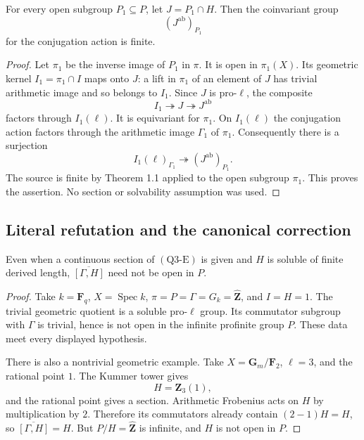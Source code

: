 \begin{lemma}
\label{q3:relative}
For every open subgroup \(P_1\subseteq P\), let \(J=P_1\cap H\).
Then the coinvariant group
\[
(J^{\mathrm{ab}})_{P_1}
\]
for the conjugation action is finite.
\end{lemma}

\begin{proof}
Let \(\pi_1\) be the inverse image of \(P_1\) in \(\pi\).  It is open
in \(\pi_1(X)\).  Its geometric kernel
\(I_1=\pi_1\cap I\) maps onto \(J\): a lift in \(\pi_1\) of an
element of \(J\) has trivial arithmetic image and so belongs to
\(I_1\).  Since \(J\) is pro-\(\ell\), the composite
\[
I_1\twoheadrightarrow J\twoheadrightarrow J^{\mathrm{ab}}
\]
factors through \(I_1(\ell)\).  It is equivariant for \(\pi_1\).
On \(I_1(\ell)\) the conjugation action factors through the arithmetic
image \(\Gamma_1\) of \(\pi_1\).  Consequently there is a surjection
\[
I_1(\ell)_{\Gamma_1}\twoheadrightarrow
(J^{\mathrm{ab}})_{P_1}.
\]
The source is finite by Theorem 1.1 applied to the open subgroup
\(\pi_1\).  This proves the assertion.  No section or solvability
assumption was used.
\end{proof}

\subsection{Literal refutation and the canonical correction}

\begin{proposition}
\label{q3:literal}
Even when a continuous section of \((\mathrm{Q3\text{-}E})\) is given
and \(H\) is soluble of finite derived length,
\(\overline{[\Gamma,H]}\) need not be open in \(P\).
\end{proposition}

\begin{proof}
Take \(k=\mathbf F_q\), \(X=\operatorname{Spec}k\),
\(\pi=P=\Gamma=G_k=\widehat{\mathbf Z}\), and \(I=H=1\).
The trivial geometric quotient is a soluble pro-\(\ell\) group.
Its commutator subgroup with \(\Gamma\) is trivial, hence is not
open in the infinite profinite group \(P\).  These data meet every
displayed hypothesis.

There is also a nontrivial geometric example.  Take
\(X=\mathbf G_m/\mathbf F_2\), \(\ell=3\), and the rational point
\(1\).  The Kummer tower gives
\[
H=\mathbf Z_3(1),
\]
and the rational point gives a section.  Arithmetic Frobenius acts
on \(H\) by multiplication by \(2\).  Therefore its commutators
already contain \((2-1)H=H\), so
\(\overline{[\Gamma,H]}=H\).  But
\(P/H=\widehat{\mathbf Z}\) is infinite, and \(H\) is not open in
\(P\).
\end{proof}

